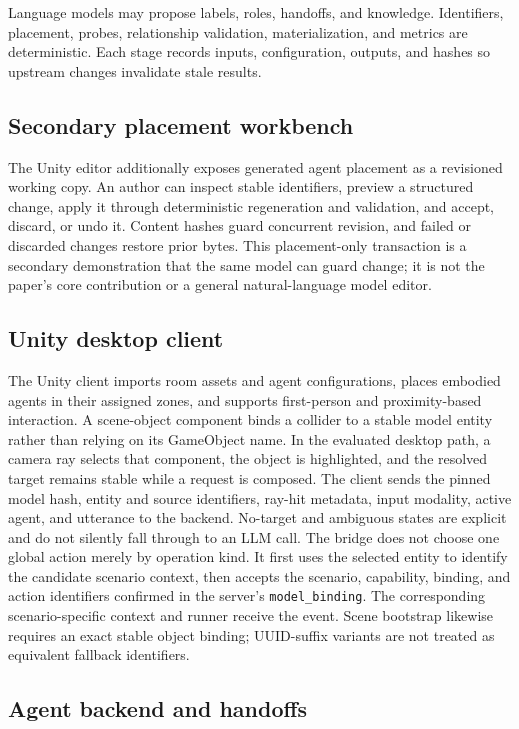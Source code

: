 Language models may propose labels, roles, handoffs, and knowledge. Identifiers,
placement, probes, relationship validation, materialization, and metrics are
deterministic. Each stage records inputs, configuration, outputs, and hashes so
upstream changes invalidate stale results.

\subsection{Secondary placement workbench}

The Unity editor additionally exposes generated agent placement as a revisioned
working copy. An author can inspect stable identifiers, preview a structured
change, apply it through deterministic regeneration and validation, and accept,
discard, or undo it. Content hashes guard concurrent revision, and failed or
discarded changes restore prior bytes. This placement-only transaction is a
secondary demonstration that the same model can guard change; it is not the
paper's core contribution or a general natural-language model editor.

\subsection{Unity desktop client}

The Unity client imports room assets and agent configurations, places embodied
agents in their assigned zones, and supports first-person and proximity-based
interaction. A scene-object component binds a collider to a stable model entity
rather than relying on its GameObject name. In the evaluated desktop path, a
camera ray selects that component, the object is highlighted, and the resolved
target remains stable while a request is composed. The client
sends the pinned model hash, entity and source identifiers, ray-hit metadata,
input modality, active agent, and utterance to the backend. No-target and
ambiguous states are explicit and do not silently fall through to an LLM call.
The bridge does not choose one global action merely by operation kind. It first
uses the selected entity to identify the candidate scenario context, then
accepts the scenario, capability, binding, and action identifiers confirmed in
the server's \texttt{model\_binding}. The corresponding scenario-specific
context and runner receive the event. Scene bootstrap likewise requires an
exact stable object binding; UUID-suffix variants are not treated as equivalent
fallback identifiers.

\subsection{Agent backend and handoffs}

